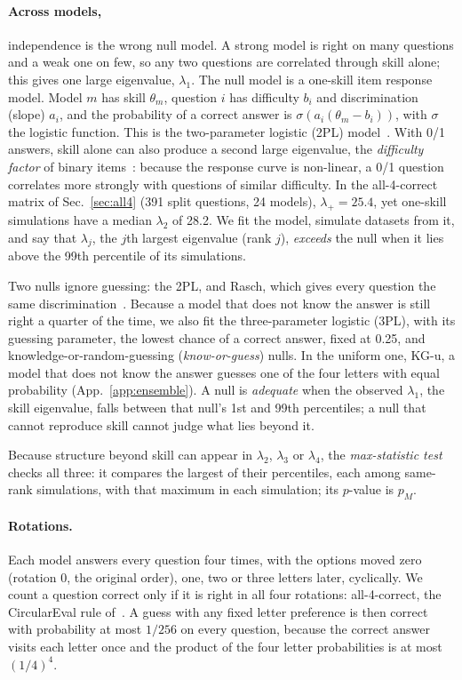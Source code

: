 \documentclass{article}
\theoremstyle{plain}
\theoremstyle{remark}
\begin{document}
\paragraph{Across models,} independence is the wrong null model. A strong
model is right on many questions and a weak one on few, so any two
questions are correlated through skill alone; this gives one large
eigenvalue, $\lambda_1$. The null model is a one-skill item response model. Model $m$
has skill $\theta_m$, question $i$ has difficulty $b_i$ and discrimination (slope) $a_i$,
and the probability of a correct answer is $\sigma(a_i(\theta_m-b_i))$,
with $\sigma$ the logistic function. This is the two-parameter logistic
(2PL) model~\citep{lordnovick1968}. With 0/1 answers, skill alone can
also produce a second large eigenvalue, the \emph{difficulty factor} of
binary items~\citep{ferguson1941,mcdonald1974}: because the response
curve is non-linear, a 0/1 question correlates more strongly with
questions of similar difficulty. In the
all-4-correct matrix of Sec.~\ref{sec:all4} (391 split questions, 24
models), $\lambda_+=25.4$, yet one-skill simulations
have a median $\lambda_2$ of 28.2. We fit the model,
simulate datasets from it, and say that $\lambda_j$, the $j$th
largest eigenvalue (rank $j$), \emph{exceeds} the null when it lies above
the 99th percentile of its simulations.

Two nulls ignore guessing: the 2PL, and Rasch, which gives every
question the same discrimination~\citep{rasch1960}. Because a model that does not know the
answer is still right a quarter of the time, we also fit the
three-parameter logistic (3PL), with its guessing parameter, the lowest
chance of a correct answer, fixed at 0.25, and knowledge-or-random-guessing
(\emph{know-or-guess}) nulls. In the uniform one, KG-u, a model that does not
know the answer guesses one of the four letters with equal probability
(App.~\ref{app:ensemble}). A null is \emph{adequate} when the
observed $\lambda_1$, the skill eigenvalue, falls between that null's 1st
and 99th percentiles; a null that cannot reproduce skill cannot judge
what lies beyond it.

Because structure beyond skill can appear in $\lambda_2$, $\lambda_3$
or $\lambda_4$, the \emph{max-statistic test} checks all three:
it compares the largest of their percentiles, each among same-rank
simulations, with that maximum in each simulation; its $p$-value is
$p_M$.

\paragraph{Rotations.} Each model answers every question four times, with
the options moved zero (rotation 0, the original order), one, two or
three letters later, cyclically. We count a question correct only if it
is right in all four rotations: all-4-correct, the
CircularEval rule of~\citet{mmbench2024}. A guess with any fixed letter preference is then correct
with probability at most $1/256$ on every question, because the correct
answer visits each letter once and the product of the four letter
probabilities is at most $(1/4)^4$.
\end{document}
